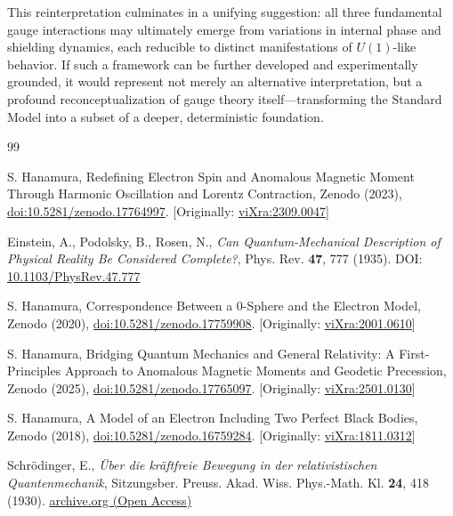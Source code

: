 \documentclass[12pt,letterpaper]{article} %
\begin{document}
This reinterpretation culminates in a unifying suggestion: all three fundamental gauge interactions may ultimately emerge from variations in internal phase and shielding dynamics, each reducible to distinct manifestations of $U(1)$-like behavior. If such a framework can be further developed and experimentally grounded, it would represent not merely an alternative interpretation, but a profound reconceptualization of gauge theory itself—transforming the Standard Model into a subset of a deeper, deterministic foundation.

\begin{thebibliography}{99}

S. Hanamura, Redefining Electron Spin and Anomalous Magnetic Moment Through Harmonic Oscillation and Lorentz Contraction, Zenodo (2023), \href{https://doi.org/10.5281/zenodo.17764997}{doi:10.5281/zenodo.17764997}. [Originally: \href{https://vixra.org/abs/2309.0047}{viXra:2309.0047}]

Einstein, A., Podolsky, B., Rosen, N., 
\textit{Can Quantum-Mechanical Description of Physical Reality Be Considered Complete?}, 
Phys. Rev. \textbf{47}, 777 (1935). 
DOI: \href{https://doi.org/10.1103/PhysRev.47.777}{10.1103/PhysRev.47.777}

S. Hanamura, Correspondence Between a 0-Sphere and the Electron Model, Zenodo (2020), \href{https://doi.org/10.5281/zenodo.17759908}{doi:10.5281/zenodo.17759908}. [Originally: \href{https://vixra.org/abs/2001.0610}{viXra:2001.0610}]

S. Hanamura, Bridging Quantum Mechanics and General Relativity: A First-Principles Approach to Anomalous Magnetic Moments and Geodetic Precession, Zenodo (2025), \href{https://doi.org/10.5281/zenodo.17765097}{doi:10.5281/zenodo.17765097}. [Originally: \href{https://vixra.org/abs/2501.0130}{viXra:2501.0130}]

S. Hanamura, A Model of an Electron Including Two Perfect Black Bodies, Zenodo (2018), \href{https://doi.org/10.5281/zenodo.16759284}{doi:10.5281/zenodo.16759284}. [Originally: \href{https://vixra.org/abs/1811.0312}{viXra:1811.0312}]

Schr\"{o}dinger, E.,
\textit{Über die kräftfreie Bewegung in der relativistischen Quantenmechanik}, 
Sitzungsber. Preuss. Akad. Wiss. Phys.-Math. Kl. \textbf{24}, 418 (1930). 
\href{https://archive.org/details/uberderkrarelativistischenquantenmechanikschrodinger19300717english}{archive.org (Open Access)}


\end{thebibliography}
\end{document}
